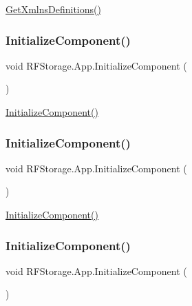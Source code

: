 \mbox{\hyperlink{class_r_f_storage_1_1_app_adcb9eaad4dc10dc6bac7bc34b8b33797}{Get\+Xmlns\+Definitions()}} 

\mbox{\label{class_r_f_storage_1_1_app_aee12f2c565f216fc400227a9c9446954}} 
\subsubsection{\texorpdfstring{InitializeComponent()}{InitializeComponent()}\hspace{0.1cm}{\footnotesize\ttfamily [1/8]}}
{\footnotesize\ttfamily void R\+F\+Storage.\+App.\+Initialize\+Component (\begin{DoxyParamCaption}{ }\end{DoxyParamCaption})}



\mbox{\hyperlink{class_r_f_storage_1_1_app_aee12f2c565f216fc400227a9c9446954}{Initialize\+Component()}} 

\mbox{\label{class_r_f_storage_1_1_app_aee12f2c565f216fc400227a9c9446954}} 
\subsubsection{\texorpdfstring{InitializeComponent()}{InitializeComponent()}\hspace{0.1cm}{\footnotesize\ttfamily [2/8]}}
{\footnotesize\ttfamily void R\+F\+Storage.\+App.\+Initialize\+Component (\begin{DoxyParamCaption}{ }\end{DoxyParamCaption})}



\mbox{\hyperlink{class_r_f_storage_1_1_app_aee12f2c565f216fc400227a9c9446954}{Initialize\+Component()}} 

\mbox{\label{class_r_f_storage_1_1_app_aee12f2c565f216fc400227a9c9446954}} 
\subsubsection{\texorpdfstring{InitializeComponent()}{InitializeComponent()}\hspace{0.1cm}{\footnotesize\ttfamily [3/8]}}
{\footnotesize\ttfamily void R\+F\+Storage.\+App.\+Initialize\+Component (\begin{DoxyParamCaption}{ }\end{DoxyParamCaption})}



